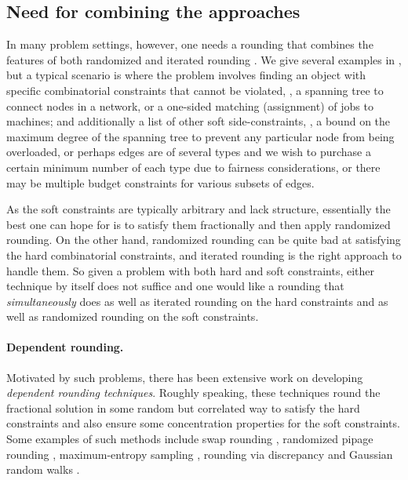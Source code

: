 \documentclass{toc}
\begin{document}
\subsection{Need for combining the approaches}
In many problem settings, %
 however, one needs a rounding that combines the features of both randomized and iterated rounding \cite{CVZ10,CVZ11,GKPS06, AGMOS10}. We give several examples in
, but a typical scenario is where
the problem involves finding an object with specific combinatorial constraints that cannot be violated, \eg, a spanning tree to connect nodes in a network, or a one-sided matching (assignment) of jobs to machines; and additionally a list of other soft side-constraints, \eg, a bound on the maximum degree of the spanning tree to prevent any particular node from being overloaded, or perhaps edges are of several types and we wish to purchase a certain minimum number of each type due to fairness considerations, or there may be multiple budget constraints for various subsets of edges. %
%

%

As the soft constraints are typically arbitrary and lack structure, essentially the best one can hope for is to satisfy them fractionally and then apply randomized rounding. On the other hand, randomized rounding can be quite bad at satisfying the hard combinatorial constraints, and iterated rounding is the right approach to handle them. So given a problem with both hard and soft constraints, either technique by itself does not suffice and one would like a rounding that \emph{simultaneously} does as well as iterated rounding on the hard constraints and as well as randomized rounding on the soft constraints.


\paragraph{Dependent rounding.}
Motivated by such problems, there has been extensive work on developing \emph{dependent rounding techniques}. Roughly speaking, these techniques round the fractional solution in some random but correlated way to satisfy the hard constraints and also ensure some concentration properties for the soft constraints.
Some examples of such methods include swap rounding \cite{CVZ10,CVZ11}, randomized pipage rounding \cite{AFK,Srin01,GKPS06,HO14},  maximum-entropy sampling \cite{AGMOS10,SV14,AS10},
rounding via discrepancy \cite{LM12, R12, BN16} and Gaussian random walks \cite{PSV17}.
%
\end{document}
